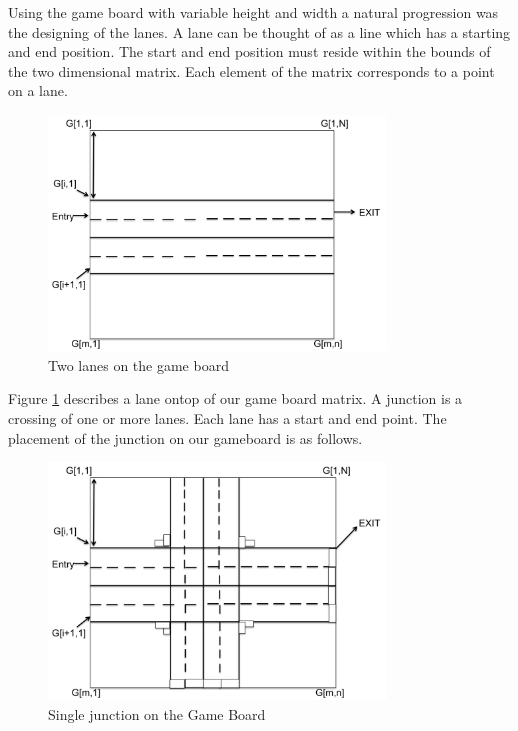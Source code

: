 \indent Using the game board with variable height and width a natural progression was the designing of the lanes. A lane can be thought of as a line which has a starting and end position. The start and end position must reside within the bounds of the two dimensional matrix. Each element of the matrix corresponds to a point on a lane.   
\begin{figure}[H]
    \centering
    \includegraphics[width=0.8\textwidth]{pics/lane.png}
    \caption{Two lanes on the game board}
    \label{fig:Lanes}
\end{figure}
Figure \ref{fig:Lanes} describes a lane ontop of our game board matrix. \newline
\indent A junction is a crossing of one or more lanes. Each lane has a start and end point. The placement of the junction on our gameboard is as follows. 
\begin{figure}[H]
    \centering
    \includegraphics[width=0.8\textwidth]{pics/map.png}
    \caption{Single junction on the Game Board} 
    \label{fig:SingleJunctionPhysical}
\end{figure}
